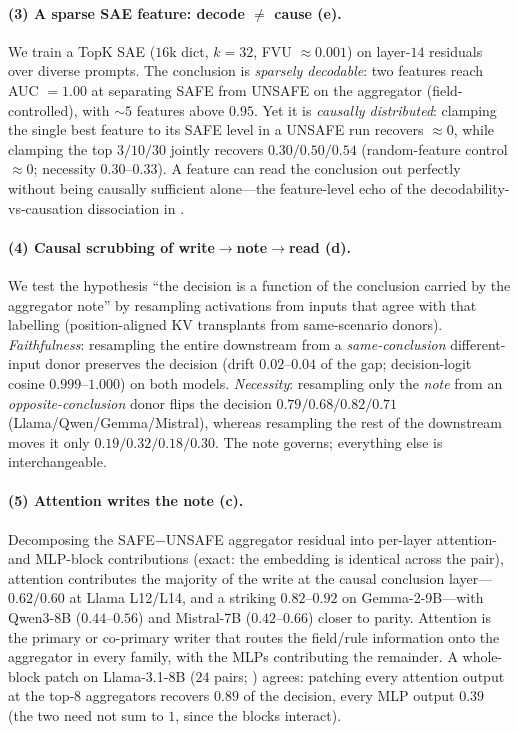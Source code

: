 \paragraph{(3) A sparse SAE feature: decode $\neq$ cause (e).} We train a TopK SAE
($16$k dict, $k{=}32$, FVU ${\approx}0.001$) on layer-$14$ residuals over diverse prompts. The conclusion is
\emph{sparsely decodable}: two features reach AUC $=1.00$ at separating SAFE from UNSAFE on the aggregator
(field-controlled), with ${\sim}5$ features above $0.95$. Yet it is \emph{causally distributed}: clamping the
single best feature to its SAFE level in a UNSAFE run recovers $\approx 0$, while clamping the top
$3/10/30$ jointly recovers $0.30/0.50/0.54$ (random-feature control $\approx 0$; necessity $0.30$--$0.33$).
A feature can read the conclusion out perfectly without being causally sufficient alone---the feature-level
echo of the decodability-vs-causation dissociation in .

\paragraph{(4) Causal scrubbing of write$\to$note$\to$read (d).} We test the hypothesis
``the decision is a function of the conclusion carried by the aggregator note'' by resampling activations
from inputs that agree with that labelling (position-aligned KV transplants from same-scenario donors).
\emph{Faithfulness}: resampling the entire downstream from a \emph{same-conclusion} different-input donor
preserves the decision (drift $0.02$--$0.04$ of the gap; decision-logit cosine $0.999$--$1.000$) on both
models. \emph{Necessity}: resampling only the \emph{note} from an \emph{opposite-conclusion} donor flips the
decision $0.79/0.68/0.82/0.71$ (Llama/Qwen/Gemma/Mistral), whereas resampling the rest of the downstream
moves it only $0.19/0.32/0.18/0.30$. The note governs; everything else is interchangeable.

\paragraph{(5) Attention writes the note (c).} Decomposing the SAFE$-$UNSAFE aggregator
residual into per-layer attention- and MLP-block contributions (exact: the embedding is identical across
the pair), attention contributes the majority of the write at the causal conclusion layer---$0.62/0.60$ at
Llama L12/L14, and a striking $0.82$--$0.92$ on Gemma-2-9B---with Qwen3-8B ($0.44$--$0.56$) and Mistral-7B
($0.42$--$0.66$) closer to parity. Attention is the primary or co-primary writer that routes the field/rule
information onto the aggregator in every family, with the MLPs contributing the remainder. A
whole-block patch on Llama-3.1-8B ($24$ pairs; ) agrees: patching every attention
output at the top-$8$ aggregators recovers $0.89$ of the decision, every MLP output $0.39$ (the two need not
sum to $1$, since the blocks interact).

